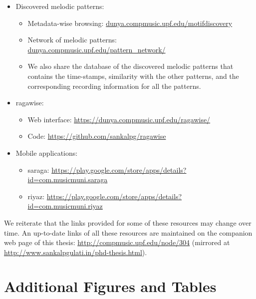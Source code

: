 \begin{itemize}
	\item Discovered melodic patterns:
	\begin{itemize}
		\item Metadata-wise browsing: \url{dunya.compmusic.upf.edu/motifdiscovery}
		\item Network of melodic patterns: \url{dunya.compmusic.upf.edu/pattern_network/}
		\item We also share the database of the discovered melodic patterns that contains the time-stamps, similarity with the other patterns, and the corresponding recording information for all the patterns.
	\end{itemize}
	\item \gls{ragawise}:
	\begin{itemize}
		\item Web interface: \url{https://dunya.compmusic.upf.edu/ragawise/}
		\item Code: \url{https://github.com/sankalpg/ragawise}
	\end{itemize}
	
	\item Mobile applications:
	\begin{itemize}
		\item \Gls{saraga}: \url{https://play.google.com/store/apps/details?id=com.musicmuni.saraga}
		\item \Gls{riyaz}: \url{https://play.google.com/store/apps/details?id=com.musicmuni.riyaz}
	\end{itemize}
\end{itemize}

We reiterate that the links provided for some of these resources may change over time. An up-to-date links of all these resources are maintained on the companion web page of this thesis: \url{http://compmusic.upf.edu/node/304} (mirrored at \url{http://www.sankalpgulati.in/phd-thesis.html}).


\chapter{Additional Figures and Tables}
\label{app:additional_material}

